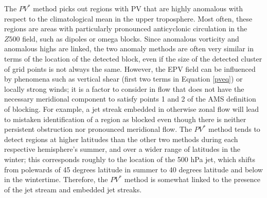 \documentclass[smallextended]{svjour3}       %
\numberwithin{equation}{section}
\begin{document}
The $PV^*$ method picks out regions with PV that are highly anomalous with respect to the climatological mean in the upper troposphere. Most often, these regions are areas with particularly pronounced anticyclonic circulation in the $Z500$ field, such as dipoles or omega blocks. Since anomalous vorticity and anomalous highs are linked, the two anomaly methods are often very similar in terms of the location of the detected block, even if the size of the detected cluster of grid points is not always the same. However, the EPV field can be influenced by phenomena such as vertical shear (first two terms in Equation \ref{pveq}) or locally strong winds; it is a factor to consider in flow that does not have the necessary meridional component to satisfy points 1 and 2 of the AMS definition of blocking. For example, a jet streak embedded in otherwise zonal flow will lead to mistaken identification of a region as blocked even though there is neither persistent obstruction nor pronounced meridional flow. {\color{blue}The $PV^*$ method tends to detect regions at higher latitudes than the other two methods during each respective hemisphere's summer, and over a wider range of latitudes in the winter; this corresponds roughly to the location of the 500 hPa jet, which shifts from polewards of 45 degrees latitude in summer to 40 degrees latitude and below in the wintertime. Therefore, the $PV^*$ method is somewhat linked to the presence of the jet stream and embedded jet streaks.}

\end{document}
